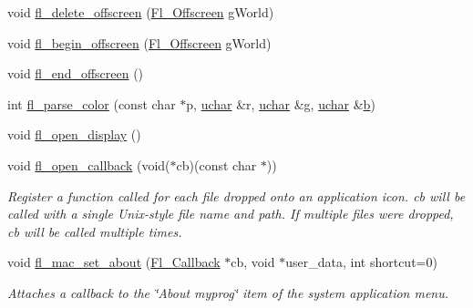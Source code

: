 \begin{DoxyCompactItemize}
\item 
void \hyperlink{mac_8_h_a12c4aafe6b26b130c04f5ea972d33480}{fl\+\_\+delete\+\_\+offscreen} (\hyperlink{mac_8_h_ad24d9679e17ea5ffa910ed355d4df340}{Fl\+\_\+\+Offscreen} g\+World)
\item 
void \hyperlink{mac_8_h_aac0378733483d10e73c694adf93f462c}{fl\+\_\+begin\+\_\+offscreen} (\hyperlink{mac_8_h_ad24d9679e17ea5ffa910ed355d4df340}{Fl\+\_\+\+Offscreen} g\+World)
\item 
void \hyperlink{mac_8_h_ac2195ac3bd679bac0b2810c8ac90faa6}{fl\+\_\+end\+\_\+offscreen} ()
\item 
int \hyperlink{mac_8_h_aa5133e4cd5219d5f79ea60727c205a22}{fl\+\_\+parse\+\_\+color} (const char $\ast$p, \hyperlink{fl__types_8h_a65f85814a8290f9797005d3b28e7e5fc}{uchar} \&r, \hyperlink{fl__types_8h_a65f85814a8290f9797005d3b28e7e5fc}{uchar} \&g, \hyperlink{fl__types_8h_a65f85814a8290f9797005d3b28e7e5fc}{uchar} \&\hyperlink{forms_8_h_a0ba06a290a384fa06b1b90745827dae2}{b})
\item 
void \hyperlink{mac_8_h_a94ee21d83137569a6730e3e2e7305cbc}{fl\+\_\+open\+\_\+display} ()
\item 
void \hyperlink{group__group__macosx_ga0702a54934d10f5b72157137cf291296}{fl\+\_\+open\+\_\+callback} (void($\ast$cb)(const char $\ast$))
\begin{DoxyCompactList}\small\item\em Register a function called for each file dropped onto an application icon. {\itshape cb} will be called with a single Unix-\/style file name and path. If multiple files were dropped, {\itshape cb} will be called multiple times. \end{DoxyCompactList}\item 
void \hyperlink{group__group__macosx_gac2ba4bfc66f7bc9792dffa2aeb53064e}{fl\+\_\+mac\+\_\+set\+\_\+about} (\hyperlink{_fl___widget_8_h_a640bea0193560eec20903c45c93c7472}{Fl\+\_\+\+Callback} $\ast$cb, void $\ast$user\+\_\+data, int shortcut=0)
\begin{DoxyCompactList}\small\item\em Attaches a callback to the \char`\"{}\+About myprog\char`\"{} item of the system application menu. \end{DoxyCompactList}\end{DoxyCompactItemize}
